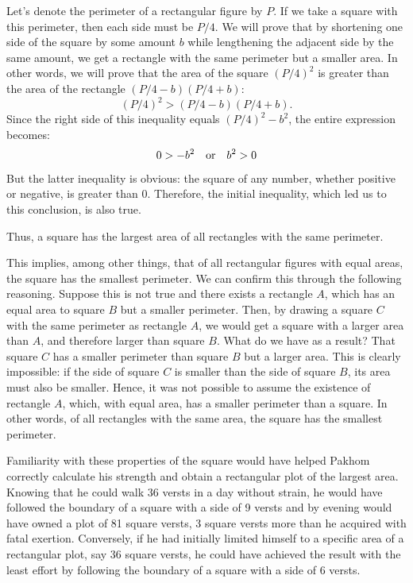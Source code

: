 Let's denote the perimeter of a rectangular figure by \( P \). If we take a square with this perimeter, then each side must be \( P/4 \). We will prove that by shortening one side of the square by some amount \( b \) while lengthening the adjacent side by the same amount, we get a rectangle with the same perimeter but a smaller area. In other words, we will prove that the area of the square \( (P/4)^{2} \) is greater than the area of the rectangle \( (P/4 - b)(P/4 + b) \):
\begin{equation*}%
 (P/4)^{2} > (P/4 - b)(P/4 + b).
\end{equation*}
Since the right side of this inequality equals \( (P/4)^{2} - b^{2} \), the entire expression becomes:
\begin{equation*}%
 0 > -b^{2} \qor b^{2} > 0 
\end{equation*}
But the latter inequality is obvious: the square of any number, whether positive or negative, is greater than 0. Therefore, the initial inequality, which led us to this conclusion, is also true.

Thus, a square has the largest area of all rectangles with the same perimeter.

This implies, among other things, that of all rectangular figures with equal areas, the square has the smallest perimeter. We can confirm this through the following reasoning. Suppose this is not true and there exists a rectangle $A$, which has an equal area to square $B$ but a smaller perimeter. Then, by drawing a square $C$ with the same perimeter as rectangle $A$, we would get a square with a larger area than $A$, and therefore larger than square $B$. What do we have as a result? That square $C$ has a smaller perimeter than square $B$ but a larger area. This is clearly impossible: if the side of square $C$ is smaller than the side of square $B$, its area must also be smaller. Hence, it was not possible to assume the existence of rectangle $A$, which, with equal area, has a smaller perimeter than a square. In other words, of all rectangles with the same area, the square has the smallest perimeter.

Familiarity with these properties of the square would have helped Pakhom correctly calculate his strength and obtain a rectangular plot of the largest area. Knowing that he could walk 36 versts in a day without strain, he would have followed the boundary of a square with a side of 9 versts and by evening would have owned a plot of 81 square versts, 3 square versts more than he acquired with fatal exertion. Conversely, if he had initially limited himself to a specific area of a rectangular plot, say 36 square versts, he could have achieved the result with the least effort by following the boundary of a square with a side of 6 versts.

